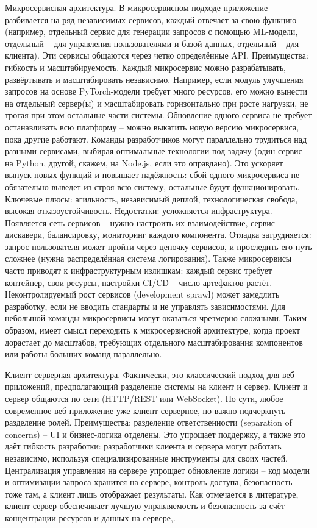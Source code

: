Микросервисная архитектура. В микросервисном подходе приложение разбивается на ряд независимых сервисов, каждый отвечает за свою функцию (например, отдельный сервис для генерации запросов с помощью ML-модели, отдельный – для управления пользователями и базой данных, отдельный – для клиента). Эти сервисы общаются через четко определённые API. Преимущества: гибкость и масштабируемость. Каждый микросервис можно разрабатывать, развёртывать и масштабировать независимо\cite{atlassian:microservices}. Например, если модуль улучшения запросов на основе PyTorch-модели требует много ресурсов, его можно вынести на отдельный сервер(ы) и масштабировать горизонтально при росте нагрузки, не трогая при этом остальные части системы. Обновление одного сервиса не требует останавливать всю платформу – можно выкатить новую версию микросервиса, пока другие работают. Команды разработчиков могут параллельно трудиться над разными сервисами, выбирая оптимальные технологии под задачу (один сервис на Python, другой, скажем, на Node.js, если это оправдано)\cite{atlassian:microservices}. Это ускоряет выпуск новых функций и повышает надёжность: сбой одного микросервиса не обязательно выведет из строя всю систему, остальные будут функционировать. Ключевые плюсы: агильность, независимый деплой, технологическая свобода, высокая отказоустойчивость\cite{atlassian:microservices}. Недостатки: усложняется инфраструктура. Появляется сеть сервисов – нужно настроить их взаимодействие, сервис-дискавери, балансировку, мониторинг каждого компонента\cite{atlassian:microservices}. Отладка затрудняется: запрос пользователя может пройти через цепочку сервисов, и проследить его путь сложнее (нужна распределённая система логирования). Также микросервисы часто приводят к инфраструктурным излишкам: каждый сервис требует контейнер, свои ресурсы, настройки CI/CD – число артефактов растёт\cite{atlassian:microservices}. Неконтролируемый рост сервисов (development sprawl) может замедлить разработку, если не вводить стандарты и не управлять зависимостями\cite{atlassian:microservices}. Для небольшой команды микросервисы могут оказаться чрезмерно сложными. Таким образом, имеет смысл переходить к микросервисной архитектуре, когда проект дорастает до масштабов, требующих отдельного масштабирования компонентов или работы больших команд параллельно. 

Клиент-серверная архитектура. Фактически, это классический подход для веб-приложений, предполагающий разделение системы на клиент и сервер. Клиент и сервер общаются по сети (HTTP/REST или WebSocket). По сути, любое современное веб-приложение уже клиент-серверное, но важно подчеркнуть разделение ролей. Преимущества: разделение ответственности (separation of concerns) – UI и бизнес-логика отделены. Это упрощает поддержку, а также это даёт гибкость разработки: разработчики клиента и сервера могут работать независимо, используя специализированные инструменты для своих частей. Централизация управления на сервере упрощает обновление логики – код модели и оптимизации запроса хранится на сервере, контроль доступа, безопасность – тоже там, а клиент лишь отображает результаты. Как отмечается в литературе, клиент-сервер обеспечивает лучшую управляемость и безопасность за счёт концентрации ресурсов и данных на сервере\cite{kitrum:clientserver},\cite{enjoyalgorithms:clientserver}.


